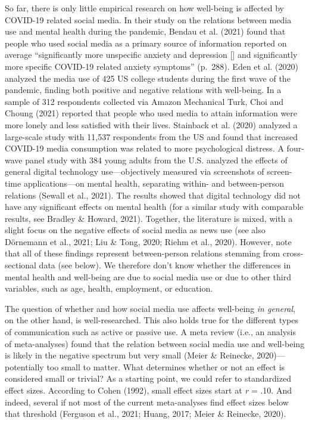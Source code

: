 \documentclass[
  man,mask]{apa7}
\begin{document}
So far, there is only little empirical research on how well-being is affected by COVID-19 related social media.
In their study on the relations between media use and mental health during the pandemic, Bendau et al. (2021) found that people who used social media as a primary source of information reported on average ``significantly more unspecific anxiety and depression {[}{]} and significantly more specific COVID-19 related anxiety symptoms'' (p.~288).
Eden et al. (2020) analyzed the media use of 425 US college students during the first wave of the pandemic, finding both positive and negative relations with well-being.
In a sample of 312 respondents collected via Amazon Mechanical Turk, Choi and Choung (2021) reported that people who used media to attain information were more lonely and less satisfied with their lives.
Stainback et al. (2020) analyzed a large-scale study with 11,537 respondents from the US and found that increased COVID-19 media consumption was related to more psychological distress.
A four-wave panel study with 384 young adults from the U.S. analyzed the effects of general digital technology use---objectively measured via screenshots of screen-time applications---on mental health, separating within- and between-person relations (Sewall et al., 2021).
The results showed that digital technology did not have any significant effects on mental health (for a similar study with comparable results, see Bradley \& Howard, 2021).
Together, the literature is mixed, with a slight focus on the negative effects of social media as news use (see also Dörnemann et al., 2021; Liu \& Tong, 2020; Riehm et al., 2020).
However, note that all of these findings represent between-person relations stemming from cross-sectional data (see below).
We therefore don't know whether the differences in mental health and well-being are due to social media use or due to other third variables, such as age, health, employment, or education.

The question of whether and how social media use affects well-being \emph{in general}, on the other hand, is well-researched.
This also holds true for the different types of communication such as active or passive use.
A meta review (i.e., an analysis of meta-analyses) found that the relation between social media use and well-being is likely in the negative spectrum but very small (Meier \& Reinecke, 2020)---potentially too small to matter.
What determines whether or not an effect is considered small or trivial?
As a starting point, we could refer to standardized effect sizes.
According to Cohen (1992), small effect sizes start at \emph{r} = .10.
And indeed, several if not most of the current meta-analyses find effect sizes below that threshold (Ferguson et al., 2021; Huang, 2017; Meier \& Reinecke, 2020).
\end{document}
